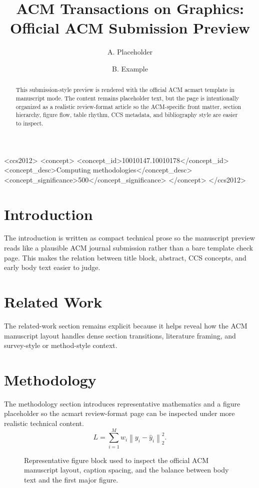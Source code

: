 \documentclass[manuscript]{acmart}
\title{ACM Transactions on Graphics: Official ACM Submission Preview}
\author{A. Placeholder}
\affiliation{%
  \institution{Department of Verified Templates, Placeholder Institute}
  \city{Placeholder City}
  \country{Country}
}
\author{B. Example}
\affiliation{%
  \institution{Journal Systems Lab, Example University}
  \city{Example City}
  \country{Country}
}
\begin{document}
\begin{abstract}
This submission-style preview is rendered with the official ACM acmart template in manuscript mode. The content remains placeholder text, but the page is intentionally organized as a realistic review-format article so the ACM-specific front matter, section hierarchy, figure flow, table rhythm, CCS metadata, and bibliography style are easier to inspect.
\end{abstract}
\begin{CCSXML}
<ccs2012>
<concept>
<concept_id>10010147.10010178</concept_id>
<concept_desc>Computing methodologies</concept_desc>
<concept_significance>500</concept_significance>
</concept>
</ccs2012>
\end{CCSXML}
\maketitle
\section{Introduction}
The introduction is written as compact technical prose so the manuscript preview reads like a plausible ACM journal submission rather than a bare template check page. This makes the relation between title block, abstract, CCS concepts, and early body text easier to judge.
\section{Related Work}
The related-work section remains explicit because it helps reveal how the ACM manuscript layout handles dense section transitions, literature framing, and survey-style or method-style context.
\section{Methodology}
The methodology section introduces representative mathematics and a figure placeholder so the acmart review-format page can be inspected under more realistic technical content.
\begin{equation}
L = \sum_{i=1}^{M} w_i \left\| y_i - \hat{y}_i \right\|_2^2.
\end{equation}
\begin{figure}[t]
\centering
{}
\caption{Representative figure block used to inspect the official ACM manuscript layout, caption spacing, and the balance between body text and the first major figure.}
\end{figure}
\end{document}
